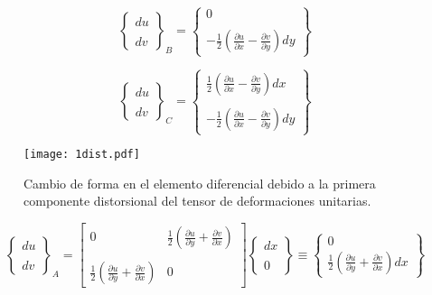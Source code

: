 \documentclass[../notas medios.tex]{subfiles}
\begin{document}
\[{\left\{ {\begin{array}{*{20}{c}}
{du}\\\\
{dv}
\end{array}} \right\}_B} = \left\{ {\begin{array}{*{20}{c}}
0\\\\
{ - \frac{1}{2}\left( {\frac{{\partial u}}{{\partial x}} - \frac{{\partial v}}{{\partial y}}} \right)dy}
\end{array}} \right\}\]

\[{\left\{ {\begin{array}{*{20}{c}}
{du}\\\\
{dv}
\end{array}} \right\}_C} = \left\{ {\begin{array}{*{20}{c}}
{\frac{1}{2}\left( {\frac{{\partial u}}{{\partial x}} - \frac{{\partial v}}{{\partial y}}} \right)dx}\\\\
{ - \frac{1}{2}\left( {\frac{{\partial u}}{{\partial x}} - \frac{{\partial v}}{{\partial y}}} \right)dy}
\end{array}} \right\}\]



\begin{figure}[H]
\centering
	\texttt{[image: 1dist.pdf]}
	\caption{Cambio de forma en el elemento diferencial debido a la primera componente distorsional del tensor de deformaciones unitarias.}
	\label{1dist}
\end{figure}

\[{\left\{ {\begin{array}{*{20}{c}}
{du}\\\\
{dv}
\end{array}} \right\}_A} = \left[ {\begin{array}{*{20}{c}}
0&{\frac{1}{2}\left( {\frac{{\partial u}}{{\partial y}} + \frac{{\partial v}}{{\partial x}}} \right)}\\\\
{\frac{1}{2}\left( {\frac{{\partial u}}{{\partial y}} + \frac{{\partial v}}{{\partial x}}} \right)}&0
\end{array}} \right]\left\{ {\begin{array}{*{20}{c}}
{dx}\\\\
0
\end{array}} \right\} \equiv \left\{ {\begin{array}{*{20}{c}}
0\\
{\frac{1}{2}\left( {\frac{{\partial u}}{{\partial y}} + \frac{{\partial v}}{{\partial x}}} \right)dx}
\end{array}} \right\}\]
\end{document}
